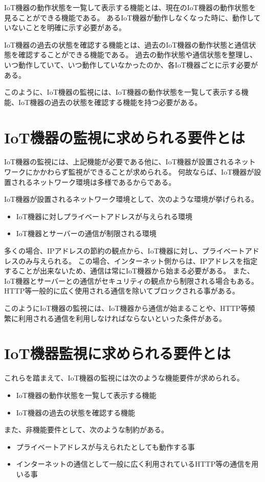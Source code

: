 IoT機器の動作状態を一覧して表示する機能とは、現在のIoT機器の動作状態を見ることができる機能である。
あるIoT機器が動作しなくなった時に、動作していないことを明確に示す必要がある。
\medskip

IoT機器の過去の状態を確認する機能とは、過去のIoT機器の動作状態と通信状態を確認することができる機能である。
過去の動作状態や通信状態を整理し、いつ動作していて、いつ動作していなかったのか、各IoT機器ごとに示す必要がある。
\medskip

このように、IoT機器の監視には、IoT機器の動作状態を一覧して表示する機能、IoT機器の過去の状態を確認する機能を持つ必要がある。

\section{IoT機器の監視に求められる要件とは}%
IoT機器の監視には、上記機能が必要である他に、IoT機器が設置されるネットワークにかかわらず監視ができることが求められる。
何故ならば、IoT機器が設置されるネットワーク環境は多様であるからである。
\medskip

IoT機器が設置されるネットワーク環境として、次のような環境が挙げられる。
\begin{itemize}
	\item IoT機器に対しプライベートアドレスが与えられる環境
	\item IoT機器とサーバーの通信が制限される環境
\end{itemize}

多くの場合、IPアドレスの節約の観点から、IoT機器に対し、プライベートアドレスのみ与えられる。
この場合、インターネット側からは、IPアドレスを指定することが出来ないため、通信は常にIoT機器から始まる必要がある。
また、IoT機器とサーバーとの通信がセキュリティの観点から制限される場合もある。
HTTP等一般的に広く使用される通信を除いてブロックされる事がある。
\medskip

このようにIoT機器の監視には、IoT機器から通信が始まることや、HTTP等頻繁に利用される通信を利用しなければならないといった条件がある。

\section{IoT機器監視に求められる要件とは}%
これらを踏まえて、IoT機器の監視には次のような機能要件が求められる。
\begin{itemize}
	\item IoT機器の動作状態を一覧して表示する機能
	\item IoT機器の過去の状態を確認する機能
\end{itemize}
また、非機能要件として、次のような制約がある。
\begin{itemize}
	\item プライベートアドレスが与えられたとしても動作する事
	\item インターネットの通信として一般に広く利用されているHTTP等の通信を用いる事
\end{itemize}
